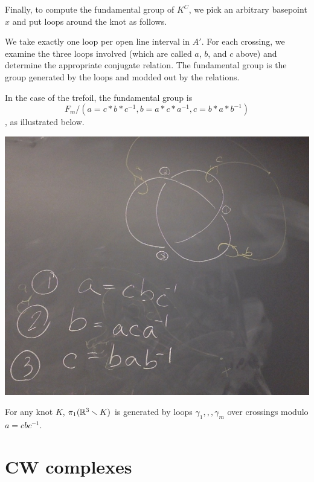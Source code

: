 \documentclass[11pt,leqno,oneside]{amsart}
\numberwithin{thm}{section}
\newcommand{\minus}{\smallsetminus}
\newcommand{\fund}[1][1]{\pi_{#1}}
\begin{document}
\begin{example}
  Finally, to compute the fundamental group of $K^C$, we pick an
  arbitrary basepoint $x$ and put loops around the knot as follows.

  We take exactly one loop per open line interval in $A'$.  For each
  crossing, we examine the three loops involved (which are called $a$,
  $b$, and $c$ above) and determine the appropriate conjugate
  relation.  The fundamental group is the group generated by the loops
  and modded out by the relations.

  In the case of the trefoil, the fundamental group
  is $${F_m}/{(a=c*b*c^{-1}, b=a*c*a^{-1}, c=b*a*b^{-1})}$$, as
  illustrated below.

  \includegraphics[scale=0.2]{images/trefoil-fully-described.jpg}
\end{example}
\begin{thm}[Wirtinger]
  For any knot $K$, $\fund(\R^3\minus K)$ is generated by loops
  $\gamma_1,,,\gamma_m$ over crossings modulo $a = cbc^{-1}$.
\end{thm}


\section{CW complexes}
\end{document}
